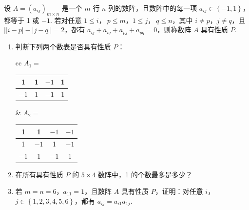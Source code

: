 \begin{problem}
设 \( A=\left( a_{ij} \right)_{m\times n} \) 是一个 \( m \) 行 \( n \) 列的数阵，且数阵中的每一项 \( a_{ij}\in \left\{ -1,1 \right\} \)，都等于 1 或 \(-1\). 若对任意 \(1\le i\)，\(\ p\le m\)，\(1\le j\)，\(\ q\le n\)，其中 \( i\neq p \)，\( j\neq q \)，且 \( \left| \left| i-p \right|-\left| j-q \right| \right|=2 \)，都有 \( a_{ij}+a_{iq}+a_{pj}+a_{pq}=0 \)，则称数阵 \(A\) 具有性质 \(P\).

\begin{enumerate}
\item 判断下列两个数表是否具有性质 \(P\)：

\begin{center}
\renewcommand{\arraystretch}{1.2}
\begin{tabular}{cc}
\(A_1=\)
\begin{tabular}{|c|c|c|c|}
\hline
1 & 1 & \(-1\) & 1 \\
\hline
\(-1\) & 1 & \(-1\) & 1 \\
\hline
\end{tabular}
&
\(A_2=\)
\begin{tabular}{|c|c|c|c|}
\hline
1 & 1 & \(-1\) & \(-1\) \\
\hline
1 & \(-1\) & 1 & \(-1\) \\
\hline
\(-1\) & 1 & \(-1\) & 1 \\
\hline
\end{tabular}
\end{tabular}
\end{center}
\item 在所有具有性质 \(P\) 的 \( 5\times 4 \) 数阵中，1 的个数最多是多少？
\item 若 \( m=n=6 \)，\( a_{11}=1 \)，且数阵 \(A\) 具有性质 \(P\)，证明：对任意 \( i \)，\( j\in \left\{ 1,2,3,4,5,6 \right\} \)，都有 \( a_{ij}=a_{i1}a_{1j} \).
\end{enumerate}
\end{problem}


